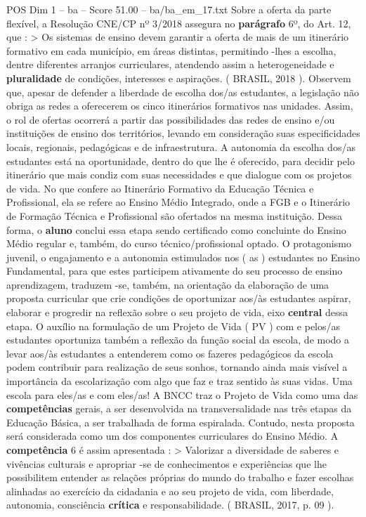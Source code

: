 \begin{textsample}{POS Dim 1 – ba – Score 51.00 – ba/ba\_em\_17.txt}
Sobre a oferta da parte flexível, a Resolução CNE/CP nº 3/2018 assegura no \textbf{parágrafo} 6º, do Art. 12, que : > Os sistemas de ensino devem garantir a oferta de mais de um itinerário formativo em cada município, em áreas distintas, permitindo -lhes a escolha, dentre diferentes arranjos curriculares, atendendo assim a heterogeneidade e \textbf{pluralidade} de condições, interesses e aspirações. ( BRASIL, 2018 ).
Observem que, apesar de defender a liberdade de escolha dos/as estudantes, a legislação não obriga as redes a oferecerem os cinco itinerários formativos nas unidades.
Assim, o rol de ofertas ocorrerá a partir das possibilidades das redes de ensino e/ou instituições de ensino dos territórios, levando em consideração suas especificidades locais, regionais, pedagógicas e de infraestrutura.
A autonomia da escolha dos/as estudantes está na oportunidade, dentro do que lhe é oferecido, para decidir pelo itinerário que mais condiz com suas necessidades e que dialogue com os projetos de vida.
No que confere ao Itinerário Formativo da Educação Técnica e Profissional, ela se refere ao Ensino Médio Integrado, onde a FGB e o Itinerário de Formação Técnica e Profissional são ofertados na mesma instituição.
Dessa forma, o \textbf{aluno} conclui essa etapa sendo certificado como concluinte do Ensino Médio regular e, também, do curso técnico/profissional optado.
O protagonismo juvenil, o engajamento e a autonomia estimulados nos ( as ) estudantes no Ensino Fundamental, para que estes participem ativamente do seu processo de ensino aprendizagem, traduzem -se, também, na orientação da elaboração de uma proposta curricular que crie condições de oportunizar aos/às estudantes aspirar, elaborar e progredir na reflexão sobre o seu projeto de vida, eixo \textbf{central} dessa etapa.
O auxílio na formulação de um Projeto de Vida ( PV ) com e pelos/as estudantes oportuniza também a reflexão da função social da escola, de modo a levar aos/às estudantes a entenderem como os fazeres pedagógicos da escola podem contribuir para realização de seus sonhos, tornando ainda mais visível a importância da escolarização com algo que faz e traz sentido às suas vidas.
Uma escola para eles/as e com eles/as!
A BNCC traz o Projeto de Vida como uma das \textbf{competências} gerais, a ser desenvolvida na transversalidade nas três etapas da Educação Básica, a ser trabalhada de forma espiralada.
Contudo, nesta proposta será considerada como um dos componentes curriculares do Ensino Médio.
A \textbf{competência} 6 é assim apresentada : > Valorizar a diversidade de saberes e vivências culturais e apropriar -se de conhecimentos e experiências que lhe possibilitem entender as relações próprias do mundo do trabalho e fazer escolhas alinhadas ao exercício da cidadania e ao seu projeto de vida, com liberdade, autonomia, consciência \textbf{crítica} e responsabilidade. ( BRASIL, 2017, p. 09 ).

\end{textsample}
